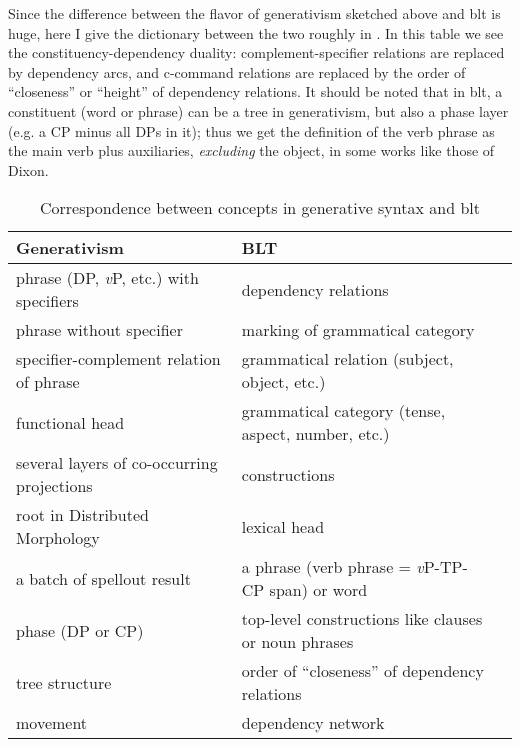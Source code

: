 \documentclass[UTF8, a4paper, oneside, scheme=plain, 12pt]{ctexbook}
\newcommand{\vP}{\textit{v}P}
\begin{document}
{Since the difference between the flavor of generativism sketched above 
and \ac{blt} is huge, 
here I give the dictionary between the two roughly in .
In this table we see the constituency-dependency duality:
complement-specifier relations are replaced by dependency arcs,
and c-command relations are replaced by the order of ``closeness'' or ``height''
of dependency relations.
It should be noted that in \ac{blt}, 
a constituent (word or phrase) can be a tree in generativism,
but also a phase layer (e.g. a CP minus all DPs in it);
thus we get the definition of the verb phrase 
as the main verb plus auxiliaries, \emph{excluding} the object, 
in some works like those of Dixon. 

\begin{table}[H]
    \caption{Correspondence between concepts in generative syntax and \acs{blt}}
    \label{tbl:theory.blt}
    \centering
    \small
    \begin{tabular}{@{}lll@{}}
    \toprule
    Generativism                               & BLT                                          \\ \midrule
    phrase (DP, \vP, etc.) with specifiers     & dependency relations                          \\
    phrase without specifier                   & marking of grammatical category               \\
    specifier-complement relation of phrase    & grammatical relation (subject, object, etc.)  \\
    functional head                            & grammatical category (tense, aspect, number,  etc.)                         \\
    several layers of co-occurring projections & constructions                                 \\
    root in Distributed Morphology             & lexical head                                          \\
    a batch of spellout result                 & a phrase (verb phrase = \vP-TP-CP span) or word    \\
    phase (DP or CP)                           & top-level constructions like clauses or noun phrases                        \\
    tree structure                             & order of ``closeness'' of dependency relations  \\
    movement                                   & dependency network                            \\ \bottomrule
    \end{tabular}
\end{table}

}
\end{document}
